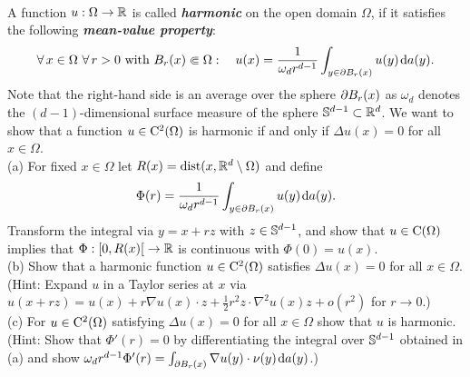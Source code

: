 \documentclass[12pt,a4paper]{article}
\begin{document}


 \\
A function $u:\Omega \to {\mathbb R}$ is called
\emph{\bfseries harmonic} on the open domain $\Omega$, if it satisfies
the following \emph{\bfseries mean-value property}:
\[
\forall\, x \in \Omega \ \forall \, r>0\text{ with }B_r(x)\Subset
\Omega : \quad u(x) = \frac1{\omega_dr^{d-1}}\int_{y\in \partial B_r(x)} 
u(y) \;\!\mathrm{d} a(y).
\]
Note that the right-hand side is an average over the sphere $\partial
B_r(x)$ as $\omega_d$ denotes the $(d{-}1)$-dimensional surface
measure of the sphere ${\mathbb S}^{d-1}\subset {\mathbb R}^d$.  We want to show that
a function $u \in {\mathrm C}^2(\Omega)$ is harmonic if and only if $\Delta
u(x)=0$ for all $x \in \Omega$.\\

(a) For fixed $x\in \Omega$ let $R(x)=\mathrm{dist}(x , {\mathbb R}^d\setminus
\Omega)$ and define
\[
\Phi(r)= \frac1{\omega_dr^{d-1}}\int_{y\in \partial B_r(x)} 
u(y) \;\!\mathrm{d} a(y) .
\]
Transform the integral via $y=x+rz$ with $z \in {\mathbb S}^{d-1}$, and show
that $u\in {\mathrm C}(\Omega)$ implies  
that $\Phi:{[0,R(x)[}\to {\mathbb R}$ is continuous with $\Phi(0)=u(x)$.\\  
%

(b) Show that a harmonic function $u\in {\mathrm C}^2(\Omega)$ satisfies
$\Delta u(x)=0$ for all $x \in \Omega$.\\ (Hint: Expand $u$ in a Taylor
series at $x$ via $u(x{+}rz)=u(x)+ r\nabla u(x)\cdot z + \frac12r^2
z\cdot \nabla^2 u(x)z + o(r^2)$ for $r\to 0$.)\\   
%

(c) For $u\in {\mathrm C}^2(\Omega)$ satisfying $\Delta u(x)=0$ for
all $x \in \Omega$ show that $u$ is harmonic. \\
(Hint: Show that $\Phi'(r)=0$ by differentiating the integral over
${\mathbb S}^{d-1}$ obtained in (a) and show $\omega_d r^{d-1} \Phi'(r) =
\int_{\partial B_r(x)} \nabla u(y) \cdot \nu(y) \;\!\mathrm{d} a(y) $.)
\end{document}
